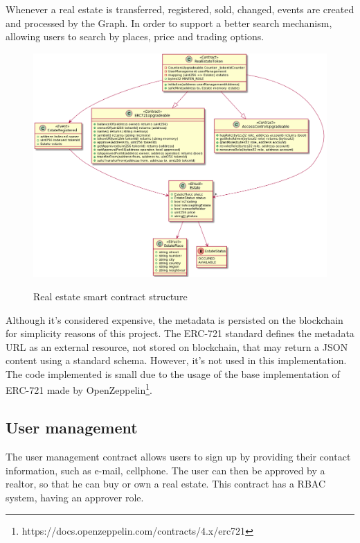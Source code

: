 \documentclass[
    article, 
    12pt,				%
	oneside,			%
	a4paper,			%
	chapter=TITLE,		%
	section=TITLE,		%
	english,			%
	english,				%
	sumario=tradicional
]{abntex2}
\begin{document}
Whenever a real estate is transferred, registered, sold, changed, events are created and processed by the Graph.
In order to support a better search mechanism, allowing users to search by places, price and trading options.

\begin{figure}[ht]
    \centering
    \caption{Real estate smart contract structure}
    \includegraphics[width=\textwidth]{images/uml/real_estate_token.png}
    \label{fig:real_estate_token_uml}
\end{figure}

Although it's considered expensive, the metadata is persisted on the blockchain for simplicity reasons of this project.
The ERC-721 standard defines the metadata URL as an external resource, not stored on blockchain, that may return a JSON content using a standard schema.
However, it's not used in this implementation.
The code implemented is small due to the usage of the base implementation of ERC-721 made by OpenZeppelin\footnote{https://docs.openzeppelin.com/contracts/4.x/erc721}.


\subsection{User management}

The user management contract allows users to sign up by providing their contact information, such as e-mail, cellphone.
The user can then be approved by a realtor, so that he can buy or own a real estate.
This contract has a RBAC system, having an approver role.
\end{document}
